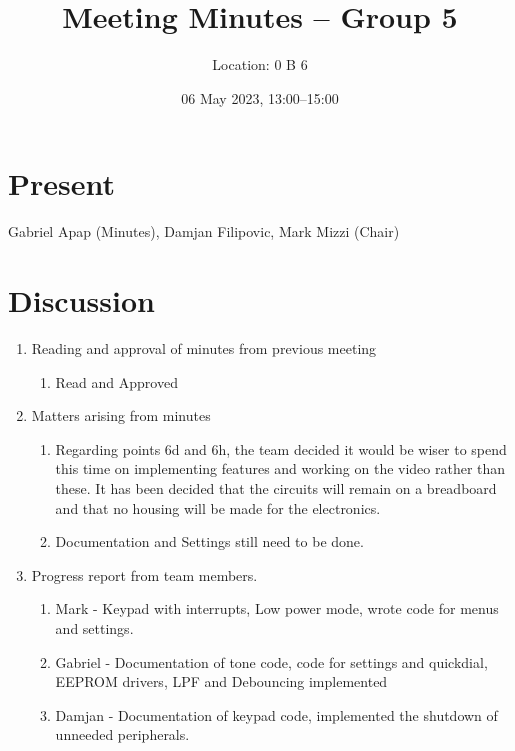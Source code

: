 \documentclass[11pt,a4paper]{scrartcl}
\title{Meeting Minutes -- Group 5}
\author{Location: 0 B 6}
\date{06 May 2023, 13:00--15:00}
\begin{document}
\maketitle

\section*{Present}
Gabriel Apap (Minutes),
Damjan Filipovic,
Mark Mizzi (Chair)

\section*{Discussion}

\begin{enumerate}

\item Reading and approval of minutes from previous meeting
\begin{enumerate}
    \item Read and Approved
\end{enumerate}


\item Matters arising from minutes
\begin{enumerate}
    \item Regarding points 6d and 6h, the team decided it would be wiser to spend this time on implementing features and working on the video rather than these. It has been decided that the circuits will remain on a breadboard and that no housing will be made for the electronics.
    \item Documentation and Settings still need to be done.
\end{enumerate}

\item Progress report from team members.
\begin{enumerate}
    \item Mark - Keypad with interrupts, Low power mode, wrote code for menus and settings.
    \item Gabriel - Documentation of tone code, code for settings and quickdial, EEPROM drivers, LPF and Debouncing implemented
    \item Damjan - Documentation of keypad code, implemented the shutdown of unneeded peripherals.
\end{enumerate}


\end{enumerate}
\end{document}
